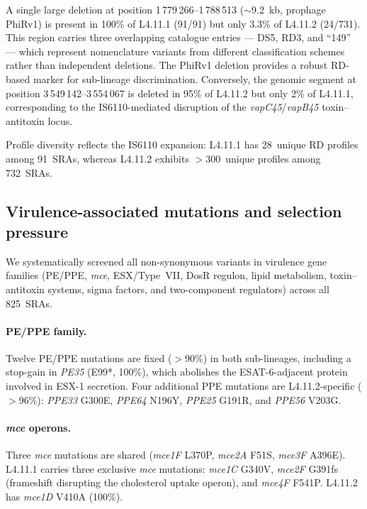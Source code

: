 \documentclass[11pt,a4paper]{article}
\newcommand{\lignee}[1]{\textsf{#1}}
\begin{document}
A single large deletion at position 1\,779\,266--1\,788\,513
($\sim$9.2~kb, prophage PhiRv1) is present in 100\% of
\lignee{L4.11.1} (91/91) but only 3.3\% of \lignee{L4.11.2}
(24/731).  This region carries three overlapping catalogue
entries --- DS5, RD3, and ``149'' --- which represent nomenclature
variants from different classification schemes rather than
independent deletions.  The PhiRv1 deletion provides a robust
RD-based marker for sub-lineage discrimination.  Conversely, the genomic
segment at position 3\,549\,142--3\,554\,067 is deleted in 95\% of
\lignee{L4.11.2} but only 2\% of \lignee{L4.11.1},
corresponding to the IS6110-mediated disruption of the
\textit{vapC45}/\textit{vapB45} toxin--antitoxin locus.

Profile diversity reflects the IS6110 expansion: \lignee{L4.11.1} has
28~unique RD profiles among 91~SRAs, whereas \lignee{L4.11.2}
exhibits $>$300~unique profiles among 732~SRAs.

\subsection{Virulence-associated mutations and selection pressure}

We systematically screened all non-synonymous variants in virulence gene
families (PE/PPE, \textit{mce}, ESX/Type~VII, DosR regulon, lipid metabolism,
toxin--antitoxin systems, sigma factors, and two-component regulators)
across all 825~SRAs.

\paragraph{PE/PPE family.}
Twelve PE/PPE mutations are fixed ($>$90\%) in both sub-lineages,
including a stop-gain in \textit{PE35} (E99*, 100\%), which
abolishes the ESAT-6-adjacent protein involved in ESX-1 secretion.
Four additional PPE mutations are \lignee{L4.11.2}-specific ($>$96\%): \textit{PPE33}
G300E, \textit{PPE64} N196Y, \textit{PPE25} G191R, and \textit{PPE56} V203G.

\paragraph{\textit{mce} operons.}
Three \textit{mce} mutations are shared (\textit{mce1F} L370P, \textit{mce2A} F51S, \textit{mce3F} A396E).
\lignee{L4.11.1} carries three exclusive \textit{mce} mutations: \textit{mce1C} G340V,
\textit{mce2F} G391fs (frameshift disrupting the cholesterol uptake
operon), and \textit{mce4F} F541P.  \lignee{L4.11.2} has \textit{mce1D} V410A (100\%).
\end{document}
